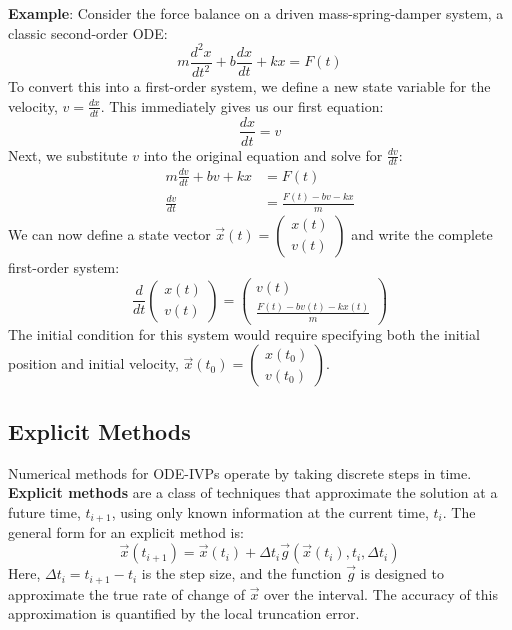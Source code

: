 \begin{exampleBox}
    \textbf{Example}: Consider the force balance on a driven mass-spring-damper system, a classic second-order ODE:
    \begin{equation*}
        m\frac{d^2x}{dt^2} + b\frac{dx}{dt} + kx = F(t)
    \end{equation*}
    To convert this into a first-order system, we define a new state variable for the velocity, $v = \frac{dx}{dt}$. This immediately gives us our first equation:
    \begin{equation*}
        \frac{dx}{dt} = v
    \end{equation*}
    Next, we substitute $v$ into the original equation and solve for $\frac{dv}{dt}$:
    \begin{align*}
        m\frac{dv}{dt} + bv + kx &= F(t) \\
        \frac{dv}{dt} &= \frac{F(t) - bv - kx}{m}
    \end{align*}
    We can now define a state vector $\vec{x}(t) = \begin{pmatrix} x(t) \\ v(t) \end{pmatrix}$ and write the complete first-order system:
    \begin{equation*}
        \frac{d}{dt}\begin{pmatrix} x(t) \\ v(t) \end{pmatrix} = \begin{pmatrix} v(t) \\ \frac{F(t) - bv(t) - kx(t)}{m} \end{pmatrix}
    \end{equation*}
    The initial condition for this system would require specifying both the initial position and initial velocity, $\vec{x}(t_0) = \begin{pmatrix} x(t_0) \\ v(t_0) \end{pmatrix}$.
\end{exampleBox}

\subsection{Explicit Methods}
\label{subsec:ivp-explicit}
Numerical methods for ODE-IVPs operate by taking discrete steps in time. \textbf{Explicit methods} are a class of techniques that approximate the solution at a future time, $t_{i+1}$, using only known information at the current time, $t_i$. The general form for an explicit method is:
\begin{equation}
    \vec{x}(t_{i+1}) = \vec{x}(t_{i}) + \Delta t_i \vec{g}(\vec{x}(t_i), t_i, \Delta t_i)
    \label{eq:explicit_general}
\end{equation}
Here, $\Delta t_i = t_{i+1} - t_i$ is the step size, and the function $\vec{g}$ is designed to approximate the true rate of change of $\vec{x}$ over the interval. The accuracy of this approximation is quantified by the local truncation error.

